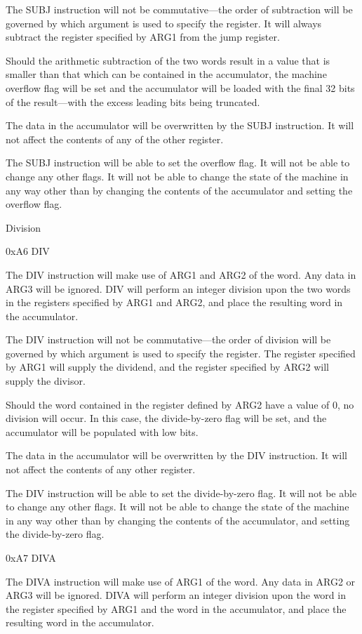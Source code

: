 \documentclass[]{article}
\begin{document}
The SUBJ instruction will not be commutative---the order of subtraction
will be governed by which argument is used to specify the register. It
will always subtract the register specified by ARG1 from the jump
register.

Should the arithmetic subtraction of the two words result in a value
that is smaller than that which can be contained in the accumulator, the
machine overflow flag will be set and the accumulator will be loaded
with the final 32 bits of the result---with the excess leading bits
being truncated.~

The data in the accumulator will be overwritten by the SUBJ instruction.
It will not affect the contents of any of the other register.~

The SUBJ instruction will be able to set the overflow flag. It will not
be able to change any other flags. It will not be able to change the
state of the machine in any way other than by changing the contents of
the accumulator and setting the overflow flag.

Division

0xA6 DIV

The DIV instruction will make use of ARG1 and ARG2 of the word. Any data
in ARG3 will be ignored. DIV will perform an integer division upon the
two words in the registers specified by ARG1 and ARG2, and place the
resulting word in the accumulator.

The DIV instruction will not be commutative---the order of division will
be governed by which argument is used to specify the register. The
register specified by ARG1 will supply the dividend, and the register
specified by ARG2 will supply the divisor.

Should the word contained in the register defined by ARG2 have a value
of 0, no division will occur. In this case, the divide-by-zero flag will
be set, and the accumulator will be populated with low bits.~

The data in the accumulator will be overwritten by the DIV instruction.
It will not affect the contents of any other register.

The DIV instruction will be able to set the divide-by-zero flag. It will
not be able to change any other flags. It will not be able to change the
state of the machine in any way other than by changing the contents of
the accumulator, and setting the divide-by-zero flag.

0xA7 DIVA

The DIVA instruction will make use of ARG1 of the word. Any data in ARG2
or ARG3 will be ignored. DIVA will perform an integer division upon the
word in the register specified by ARG1 and the word in the accumulator,
and place the resulting word in the accumulator.
\end{document}
